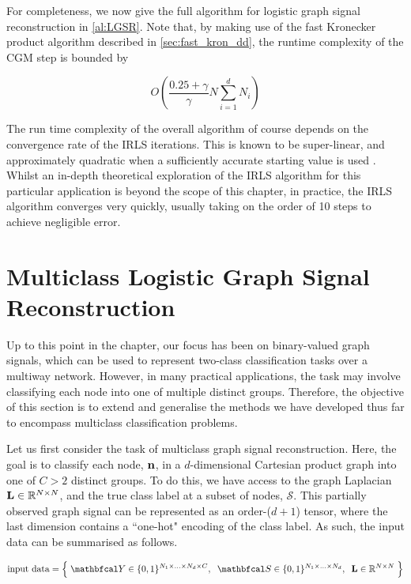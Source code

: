 For completeness, we now give the full algorithm for logistic graph signal reconstruction in \cref{al:LGSR}. Note that, by making use of the fast Kronecker product algorithm described in \cref{sec:fast_kron_dd}, the runtime complexity of the CGM step is bounded by 

\begin{equation*}
    O\left(\frac{0.25 + \gamma}{\gamma} N \sum_{i=1}^d N_i \right)
\end{equation*}

The run time complexity of the overall algorithm of course depends on the convergence rate of the IRLS iterations. This is known to be super-linear, and approximately quadratic when a sufficiently accurate starting value is used \citep{Burden2010}. Whilst an in-depth theoretical exploration of the IRLS algorithm for this particular application is beyond the scope of this chapter, in practice, the IRLS algorithm converges very quickly, usually taking on the order of 10 steps to achieve negligible error.

\section{Multiclass Logistic Graph Signal Reconstruction}

\label{sec:multiclass}

Up to this point in the chapter, our focus has been on binary-valued graph signals, which can be used to represent two-class classification tasks over a multiway network. However, in many practical applications, the task may involve classifying each node into one of multiple distinct groups. Therefore, the objective of this section is to extend and generalise the methods we have developed thus far to encompass multiclass classification problems.

Let us first consider the task of multiclass graph signal reconstruction. Here, the goal is to classify each node, $\mathbf{n}$, in a $d$-dimensional Cartesian product graph into one of $C>2$ distinct groups. To do this, we have access to the graph Laplacian $\mathbf{L} \in \mathbb{R}^{N \times N}$, and the true class label at a subset of nodes, $\mathcal{S}$. This partially observed graph signal can be represented as an order-($d + 1$) tensor, where the last dimension contains a ``one-hot" encoding of the class label. As such, the input data can be summarised as follows. 

\begin{equation*}
    \text{input data} = \Big\{\; \Yt \in \{0, 1\}^{N_1 \times ... \times N_d \times C}, \;\; \St \in \{0, 1\}^{N_1 \times ... \times N_d} , \;\; \LL \in \R^{N \times N} \; \Big\}
\end{equation*}

